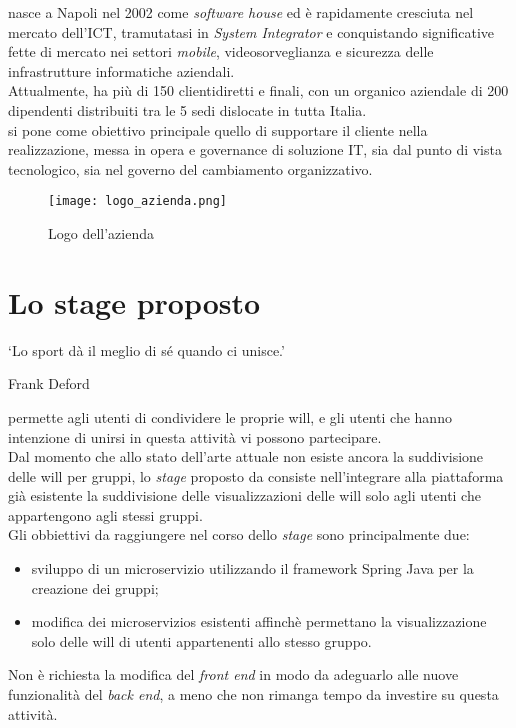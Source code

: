 \myCompany\xspace nasce a Napoli nel 2002 come \textit{software house} ed è rapidamente cresciuta nel
mercato dell'\gls{ICT}, tramutatasi in \textit{System Integrator} e conquistando significative fette di mercato nei settori 
\textit{mobile}, videosorveglianza e sicurezza delle infrastrutture informatiche aziendali. \\
Attualmente, \myCompany\xspace ha più di 150 clientidiretti e finali, con un organico aziendale
 di 200 dipendenti distribuiti tra le 5 sedi dislocate in tutta Italia.\\
\myCompany\xspace si pone come obiettivo principale quello di supportare il cliente nella realizzazione,
messa in opera e governance di soluzione IT, sia dal punto di vista tecnologico,
sia nel governo del cambiamento organizzativo.
\begin{figure}[!h] 
    \centering 
    \texttt{[image: logo\_azienda.png]} 
    \caption{Logo dell'azienda}
\end{figure}

\section{Lo stage proposto}
\epigraph{\label{eph: sport}\enquote*{Lo sport dà il meglio di sé quando ci unisce.}}{Frank Deford}
\noindent \productName permette agli utenti di condividere le proprie \gls{will}, 
e gli utenti che hanno intenzione di unirsi in questa attività vi possono partecipare.\\
Dal momento che allo stato dell'arte attuale non esiste ancora la suddivisione delle \gls{will}
per gruppi, lo \textit{stage} proposto da \myCompany consiste nell'integrare alla piattaforma già esistente
la suddivisione delle visualizzazioni delle \gls{will} solo agli utenti che 
appartengono agli stessi gruppi.\\  
Gli obbiettivi da raggiungere nel corso dello \textit{stage} sono principalmente due:
\begin{itemize}
    \item sviluppo di un \gls{microservizio} utilizzando il \gls{framework} \gls{Spring} Java per la creazione dei gruppi;
    \item modifica dei \glspl{microservizio} esistenti affinchè permettano la visualizzazione solo delle \gls{will} di utenti appartenenti allo stesso gruppo.
\end{itemize}
Non è richiesta la modifica del \textit{front end} in modo da adeguarlo alle nuove funzionalità del \textit{back end}, a meno che 
non rimanga tempo da investire su questa attività.

